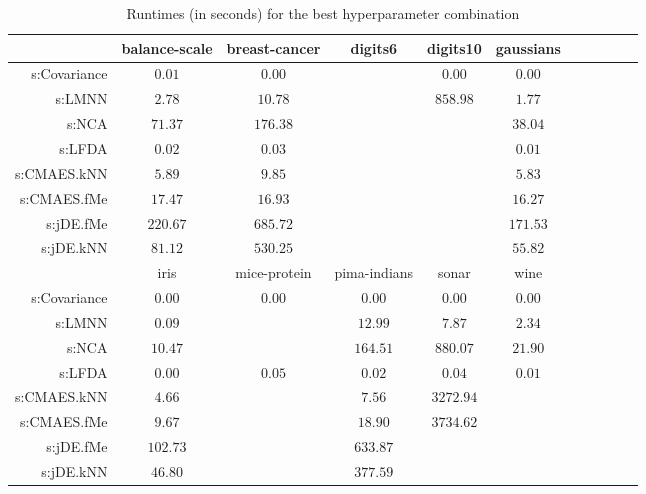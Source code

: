 \begin{table}[ht] \centering
{\small\renewcommand{\arraystretch}{1.0}
\setlength{\tabcolsep}{2pt}
\begin{tabular}{rcccccccccc}
\toprule


& \multicolumn{1}{c}{balance-scale} & \multicolumn{1}{c}{breast-cancer} & \multicolumn{1}{c}{digits6} & \multicolumn{1}{c}{digits10} & \multicolumn{1}{c}{gaussians} \\ 
\midrule
s:Covariance & $\bm{0.01}$ & $\bm{0.00}$ &  & $\bm{0.00}$ & $\bm{0.00}$ \\
s:LMNN & $2.78$ & $10.78$ &  & $858.98$ & $1.77$ \\
s:NCA & $71.37$ & $176.38$ &  &  & $38.04$ \\
s:LFDA & $0.02$ & $0.03$ &  &  & $0.01$ \\
s:CMAES.kNN & $5.89$ & $9.85$ &  &  & $5.83$ \\
s:CMAES.fMe & $17.47$ & $16.93$ &  &  & $16.27$ \\
s:jDE.fMe & $220.67$ & $685.72$ &  &  & $171.53$ \\
s:jDE.kNN & $81.12$ & $530.25$ &  &  & $55.82$ \\
\midrule
& \multicolumn{1}{c}{iris} & \multicolumn{1}{c}{mice-protein} & \multicolumn{1}{c}{pima-indians} & \multicolumn{1}{c}{sonar} & \multicolumn{1}{c}{wine} \\ 
\midrule
s:Covariance & $\bm{0.00}$ & $\bm{0.00}$ & $\bm{0.00}$ & $\bm{0.00}$ & $\bm{0.00}$ \\
s:LMNN & $0.09$ &  & $12.99$ & $7.87$ & $2.34$ \\
s:NCA & $10.47$ &  & $164.51$ & $880.07$ & $21.90$ \\
s:LFDA & $\bm{0.00}$ & $0.05$ & $0.02$ & $0.04$ & $0.01$ \\
s:CMAES.kNN & $4.66$ &  & $7.56$ & $3272.94$ &  \\
s:CMAES.fMe & $9.67$ &  & $18.90$ & $3734.62$ &  \\
s:jDE.fMe & $102.73$ &  & $633.87$ &  &  \\
s:jDE.kNN & $46.80$ &  & $377.59$ &  &  \\


\bottomrule
\end{tabular}
}
\caption{Runtimes (in seconds) for the best hyperparameter combination} \label{tab:runtimes}
\end{table}
